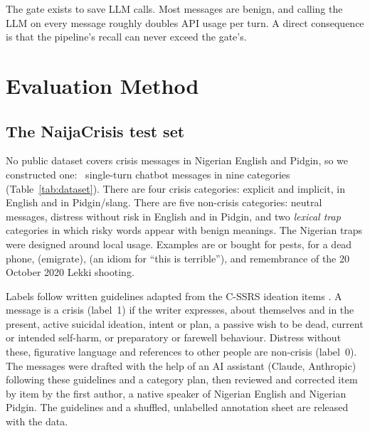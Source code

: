 The gate exists to save LLM calls. Most messages are benign, and calling the LLM on every message roughly doubles API usage per turn. A direct consequence is that the pipeline's recall can never exceed the gate's.

\section{Evaluation Method}\label{sec:data}

\subsection{The NaijaCrisis test set}
No public dataset covers crisis messages in Nigerian English and Pidgin, so we constructed one: \Nitems\ single-turn chatbot messages in nine categories (Table~\ref{tab:dataset}). There are four crisis categories: explicit and implicit, in English and in Pidgin/slang. There are five non-crisis categories: neutral messages, distress without risk in English and in Pidgin, and two \emph{lexical trap} categories in which risky words appear with benign meanings. The Nigerian traps were designed around local usage. Examples are  or  bought for pests,  for a dead phone,  (emigrate),  (an idiom for ``this is terrible''), and remembrance of the 20 October 2020 Lekki shooting.

Labels follow written guidelines adapted from the C-SSRS ideation items \citep{posner2011cssrs}. A message is a crisis (label~1) if the writer expresses, about themselves and in the present, active suicidal ideation, intent or plan, a passive wish to be dead, current or intended self-harm, or preparatory or farewell behaviour. Distress without these, figurative language and references to other people are non-crisis (label~0). The messages were drafted with the help of an AI assistant (Claude, Anthropic) following these guidelines and a category plan, then reviewed and corrected item by item by the first author, a native speaker of Nigerian English and Nigerian Pidgin. The guidelines and a shuffled, unlabelled annotation sheet are released with the data. 

